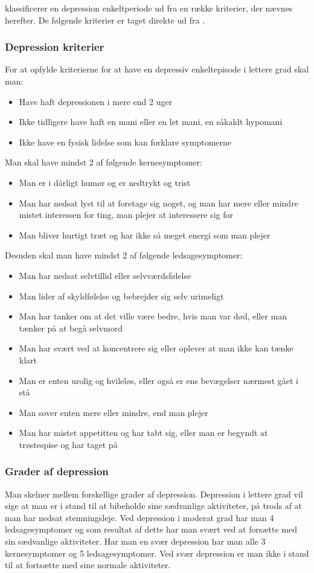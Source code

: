 \citet{misc:netpsykdepression} klassificerer en depression enkeltperiode ud fra en række kriterier, der nævnes herefter.
De følgende kriterier er taget direkte ud fra \citet{misc:netpsykdepression}.

\subsubsection{Depression kriterier}
For at opfylde kriterierne for at have en depressiv enkeltepisode i lettere grad skal man:
\begin{itemize}
	\item Have haft depressionen i mere end 2 uger
	\item Ikke tidligere have haft en mani eller en let mani, en såkaldt hypomani
	\item Ikke have en fysisk lidelse som kan forklare symptomerne
\end{itemize}
Man skal have mindst 2 af følgende kernesymptomer:
\begin{itemize}
	\item Man er i dårligt humør og er nedtrykt og trist
	\item Man har nedsat lyst til at foretage sig noget, og man har mere eller mindre mistet interessen for ting, man plejer at interessere sig for
	\item Man bliver hurtigt træt og har ikke så meget energi som man plejer
\end{itemize}
Desuden skal man have mindst 2 af følgende ledsagesymptomer:
\begin{itemize}
	\item Man har nedsat selvtillid eller selvværdsfølelse
	\item Man lider af skyldfølelse og bebrejder sig selv urimeligt
	\item Man har tanker om at det ville være bedre, hvis man var død, eller man tænker på at begå selvmord
	\item Man har svært ved at koncentrere sig eller oplever at man ikke kan tænke klart
	\item Man er enten urolig og hvileløs, eller også er ens bevægelser nærmest gået i stå
	\item Man sover enten mere eller mindre, end man plejer
	\item Man har mistet appetitten og har tabt sig, eller man er begyndt at trøstespise og har taget på
\end{itemize}

\subsubsection{Grader af depression}
Man skelner mellem forskellige grader af depression.
Depression i lettere grad vil sige at man er i stand til at bibeholde sine sædvanlige aktiviteter, på trods af at man har nedsat stemningsleje.
Ved depression i moderat grad har man 4 ledsagesymptomer og som resultat af dette har man svært ved at forsætte med sin sædvanlige aktiviteter.
Har man en svær depression har man alle 3 kernesymptomer og 5 ledsagesymptomer.
Ved svær depression er man ikke i stand til at fortsætte med sine normale aktiviteter.

